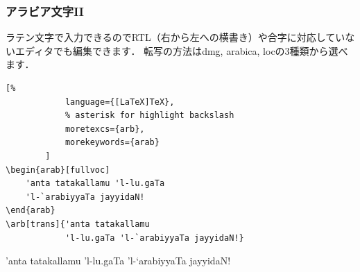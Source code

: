 \documentclass[%
    hyperref={%
        colorlinks,
        linkcolor=sDarkBlue,
        urlcolor=sDarkBlue,
        citecolor=sDarkBlue
    }
]{beamer}
\newcommand{\inlinecommand}[1]{{\ttfamily #1}}
\begin{document}
    \begin{frame}[fragile]
        \frametitle{アラビア文字II}
        ラテン文字で入力できるのでRTL（右から左への横書き）や合字に対応していないエディタでも編集できます．
        転写の方法は\inlinecommand{dmg}, \inlinecommand{arabica}, \inlinecommand{loc}の3種類から選べます．

        \begin{leftbar}
        \begin{lstlisting}[%
            language={[LaTeX]TeX},
            % asterisk for highlight backslash
            moretexcs={arb},
            morekeywords={arab}
        ]
\begin{arab}[fullvoc]
    'anta tatakallamu 'l-lu.gaTa
    'l-`arabiyyaTa jayyidaN!
\end{arab}
\arb[trans]{'anta tatakallamu
            'l-lu.gaTa 'l-`arabiyyaTa jayyidaN!}
        \end{lstlisting}
        \end{leftbar}

        \begin{arab}[fullvoc]
            'anta tatakallamu 'l-lu.gaTa 'l-`arabiyyaTa jayyidaN!
        \end{arab}

        \bigskip

    \end{frame}
\end{document}
